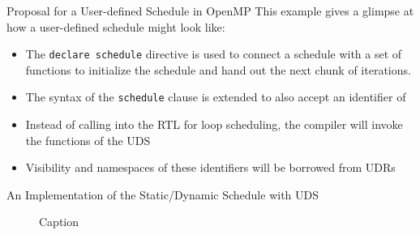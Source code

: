 \begin{frame}{ Proposal for a User-defined Schedule in OpenMP} 
This example gives a glimpse at how a user-defined schedule might look like:


\begin{figure}[ht!]

\end{figure}

\begin{itemize} 
\item The \texttt{declare schedule} directive is used to connect a schedule with a set of functions to initialize the schedule and hand out the next chunk of iterations.
\item The syntax of the \texttt{schedule} clause is extended to also accept an identifier of 
\item Instead of calling into the RTL for loop scheduling, the compiler will invoke the functions of the UDS 
\item Visibility and namespaces of these identifiers will be borrowed from UDRs
\end{itemize}  
\end{frame} 

\begin{frame}{An Implementation of the Static/Dynamic Schedule with UDS}

\begin{figure}
    \centering 
    
    \caption{Caption}
    \label{fig:my_label}
\end{figure}
\end{frame} 

